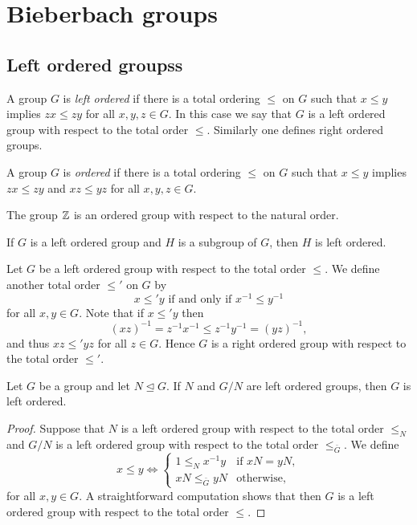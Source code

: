 \chapter{Bieberbach groups}
\label{Bieberbach}

\section{Left ordered groupss}


A group $G$ is {\em left ordered} if there is a total ordering $\leq$ on $G$ 
such that $x\leq y$ implies $zx\leq zy$ for all $x,y,z\in G$. In this case we say that $G$ is a left ordered group with respect to the total order $\leq$. Similarly one
defines right ordered groups. 

A group $G$ is {\em ordered} if there is a total ordering $\leq$ on $G$ 
such that $x\leq y$ implies $zx\leq zy$ and $xz\leq yz$ for all $x,y,z\in G$.

\begin{example}
The group $\mathbb{Z}$ is an ordered group with respect to the natural order. 
\end{example}

\begin{example}
	If $G$ is a left ordered group and $H$ is a subgroup of $G$, then $H$ is left ordered.
\end{example}

\begin{remark}
Let $G$ be a left ordered group with respect to the total order $\leq$. We define another total order $\leq'$ on $G$ by
\[ x\leq' y\text{ if and only if }x^{-1}\leq y^{-1}\]
for all $x,y\in G$. Note that if $x\leq' y$ then
\[ (xz)^{-1}=z^{-1}x^{-1}\leq z^{-1}y^{-1}=(yz)^{-1},\]
and thus $xz\leq' yz$ for all $z\in G$. Hence $G$ is a right ordered group with respect to the total order $\leq'$.
\end{remark}

\begin{proposition}\label{prop:LOgroup1}
Let $G$ be a group and let $N\unlhd G$. If $N$ and $G/N$ are left ordered groups, then $G$ is left ordered. 
\end{proposition}

\begin{proof}
Suppose that $N$ is a left ordered group with respect to the total order $\leq_N$ and $G/N$ is a left ordered group with respect to the total order $\leq_{\bar G}$.	We define 
	\[
	x\leq y\Longleftrightarrow
	\begin{cases}
		1\leq_N x^{-1}y & \text{if $xN=yN$},\\
		xN\leq_{\bar G}yN & \text{otherwise},		
	\end{cases}
	\]
for all $x,y\in G$.	A straightforward computation shows that then $G$ is a left ordered group with respect to the total order $\leq$. 
\end{proof}

